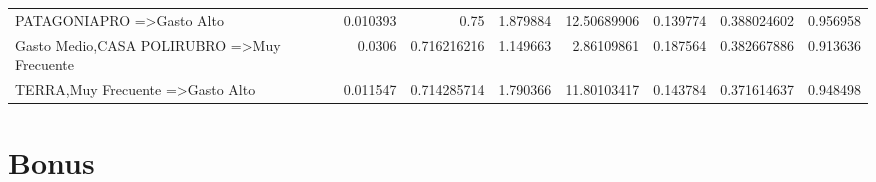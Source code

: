 \documentclass[]{article}
\begin{document}
\begin{landscape}
\begin{table}[htbp]
\begin{tabular}{lrrrrrrr}
			{PATAGONIAPRO} =\textgreater {Gasto Alto} & 0.010393 & 0.75  & 1.879884 & 12.50689906 & 0.139774 & 0.388024602 & 0.956958 \\
			{Gasto Medio,CASA POLIRUBRO} =\textgreater {Muy Frecuente} & 0.0306 & 0.716216216 & 1.149663 & 2.86109861 & 0.187564 & 0.382667886 & 0.913636 \\
			{TERRA,Muy Frecuente} =\textgreater {Gasto Alto} & 0.011547 & 0.714285714 & 1.790366 & 11.80103417 & 0.143784 & 0.371614637 & 0.948498 \\			
		\end{tabular}%
		\label{tab:addlabel}%
	\end{table}%
\end{landscape}



\section{Bonus}



\end{document}

